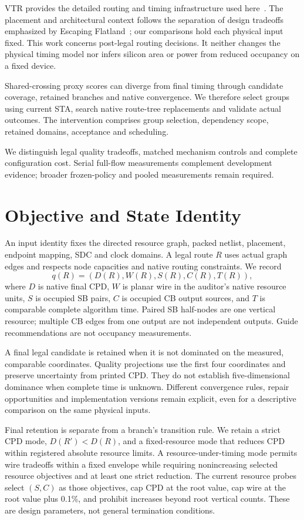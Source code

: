 \documentclass[conference,10pt]{IEEEtran}
\begin{document}
VTR provides the detailed routing and timing infrastructure used here~\cite{vtr9paper}. The placement and architectural context follows the separation of design tradeoffs emphasized by Escaping Flatland~\cite{flatland}; our comparisons hold each physical input fixed. This work concerns post-legal routing decisions. It neither changes the physical timing model nor infers silicon area or power from reduced occupancy on a fixed device.

Shared-crossing proxy scores can diverge from final timing through candidate coverage, retained branches and native convergence. We therefore select groups using current STA, search native route-tree replacements and validate actual outcomes. The intervention comprises group selection, dependency scope, retained domains, acceptance and scheduling.

We distinguish legal quality tradeoffs, matched mechanism controls and complete configuration cost. Serial full-flow measurements complement development evidence; broader frozen-policy and pooled measurements remain required.

\section{Objective and State Identity}
An input identity fixes the directed resource graph, packed netlist, placement, endpoint mapping, SDC and clock domains. A legal route $R$ uses actual graph edges and respects node capacities and native routing constraints. We record
\begin{equation}
 q(R)=(D(R),W(R),S(R),C(R),T(R)),
\end{equation}
where $D$ is native final CPD, $W$ is planar wire in the auditor's native resource units, $S$ is occupied SB pairs, $C$ is occupied CB output sources, and $T$ is comparable complete algorithm time. Paired SB half-nodes are one vertical resource; multiple CB edges from one output are not independent outputs. Guide recommendations are not occupancy measurements.

A final legal candidate is retained when it is not dominated on the measured, comparable coordinates. Quality projections use the first four coordinates and preserve uncertainty from printed CPD. They do not establish five-dimensional dominance when complete time is unknown. Different convergence rules, repair opportunities and implementation versions remain explicit, even for a descriptive comparison on the same physical inputs.

Final retention is separate from a branch's transition rule. We retain a strict CPD mode, $D(R')<D(R)$, and a fixed-resource mode that reduces CPD within registered absolute resource limits. A resource-under-timing mode permits wire tradeoffs within a fixed envelope while requiring nonincreasing selected resource objectives and at least one strict reduction. The current resource probes select $(S,C)$ as those objectives, cap CPD at the root value, cap wire at the root value plus 0.1\%, and prohibit increases beyond root vertical counts. These are design parameters, not general termination conditions.
\end{document}
